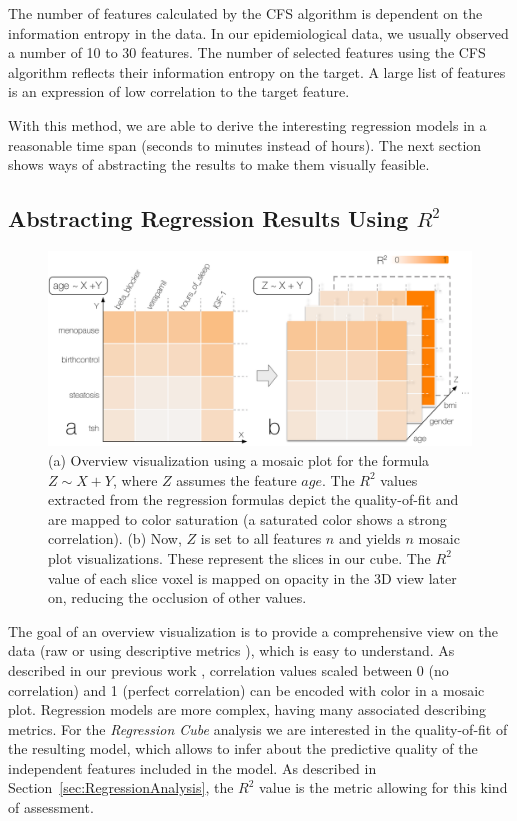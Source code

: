 \documentclass[journal]{style/vgtc} 			          %
\begin{document}
The number of features calculated by the CFS algorithm is dependent on the information entropy in the data.
In our epidemiological data, we usually observed a number of 10 to 30 features.
The number of selected features using the CFS algorithm reflects their information entropy on the target.
A large list of features is an expression of low correlation to the target feature.

With this method, we are able to derive the interesting regression models in a reasonable time span (seconds to minutes instead of hours).
The next section shows ways of abstracting the results to make them visually feasible.

\subsection{Abstracting Regression Results Using $R^2$}
\begin{figure}[htb]
 \centering
 \includegraphics[width=1.0\linewidth]{figures/cube}
 \caption{
 (a) Overview visualization using a mosaic plot for the formula $Z \sim X + Y$, where $Z$ assumes the feature $age$.
 The $R^2$ values extracted from the regression formulas depict the quality-of-fit and are mapped to color saturation (a saturated color shows a strong correlation).
 (b) Now, $Z$ is set to all features $n$ and yields $n$ mosaic plot visualizations.
 These represent the slices in our cube.
 The $R^2$ value of each slice voxel is mapped on opacity in the 3D view later on, reducing the occlusion of other values.
 }
  \label{fig:Cube}
\end{figure}
The goal of an overview visualization is to provide a comprehensive view on the data (raw or using descriptive metrics \cite{Bertini}), which is easy to understand.
As described in our previous work \cite{Klemm2014VIS}, correlation values scaled between 0 (no correlation) and 1 (perfect correlation) can be encoded with color in a mosaic plot.
Regression models are more complex, having many associated describing metrics.
For the \emph{Regression Cube} analysis we are interested in the quality-of-fit of the resulting model, which allows to infer about the predictive quality of the independent features included in the model.
As described in Section~\ref{sec:RegressionAnalysis}, the $R^2$ value is the metric allowing for this kind of assessment.
\end{document}
